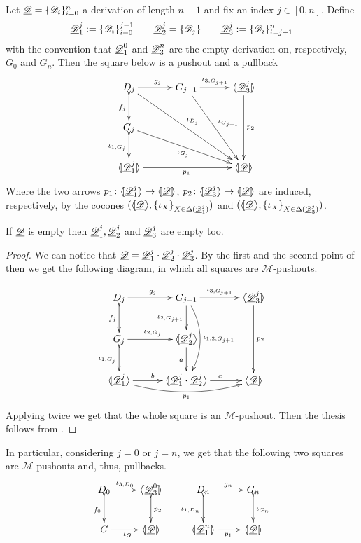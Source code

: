 \begin{corollary}\label{cor:colim}
Let $\underline{\mathscr{D}}=\{\mathscr{D}_i\}_{i=0}^n$ a derivation of length $n+1$ and fix an index $j\in[0,n]$. Define
\[\underline{\mathscr{D}}^j_1:=\{\mathscr{D}_i\}_{i=0}^{j-1} \qquad  \underline{\mathscr{D}}^j_2=\{\mathscr{D}_j\} \qquad \underline{\mathscr{D}}^j_3:=\{\mathscr{D}_i\}_{i=j+1}^n\]
with the convention that $\underline{\mathscr{D}}^0_1$ and $\underline{\mathscr{D}}^n_3$ are the empty derivation on, respectively, $G_0$ and $G_n$. Then the square below is a pushout and a pullback
\[\xymatrix@C=30pt{D_{j} \ar[ddrr]^{\iota_{D_j}} \ar[r]^{g_j}\ar@{>->}[d]_{f_j}& G_{j+1} \ar[ddr]^{\iota_{G_{j+1}}} \ar[r]^-{\iota_{3, G_{j+1}}} & \lpro \der{D}^j_3\rpro \ar[dd]^{p_2} \\ G_j\ar[drr]_{\iota_{G_{j}}} \ar@{>->}[d]_{\iota_{1,G_j}}\\ \lpro \der{D}^j_1 \rpro \ar[rr]_{p_1}  &&\tpro{D} }\] 
Where the two arrows $p_1\colon \langle \hspace{-1.85pt}[\underline{\mathscr{D}}^j_1 ]\hspace{-1.85pt}\rangle\to \langle \hspace{-1.85pt}[ \underline{\mathscr{D}}]\hspace{-1.85pt}\rangle$, $p_2\colon \langle \hspace{-1.85pt}[ \underline{\mathscr{D}}^j_3]\hspace{-1.85pt}\rangle \to \langle \hspace{-1.85pt}[ \underline{\mathscr{D}}]\hspace{-1.85pt}\rangle$ are induced, respectively, by the cocones $(\langle \hspace{-1.85pt}[ \underline{\mathscr{D}}]\hspace{-1.85pt}\rangle, \{\iota_{X}\}_{X\in \Delta(\underline{\mathscr{D}}^j_1)})$ and $(\langle \hspace{-1.85pt}[ \underline{\mathscr{D}}]\hspace{-1.85pt}\rangle, \{\iota_{X}\}_{X\in \Delta(\underline{\mathscr{D}}^j_3)})$.
\end{corollary}
\begin{remark}
If $\underline{\mathscr{D}}$ is empty then $\underline{\mathscr{D}}^j_1, \underline{\mathscr{D}}^j_2$ and $\underline{\mathscr{D}}^j_3$ are empty too.
\end{remark}
\begin{proof}
We can notice that $\underline{\mathscr{D}}=\underline{\mathscr{D}}^j_1\cdot \underline{\mathscr{D}}^j_2 \cdot \underline{\mathscr{D}}^j_3$. By the first and the second point of  then we get the following diagram, in which all squares are $\mathcal{M}$-pushouts.

\[\xymatrix@C=30pt{D_{j}  \ar[r]^{g_j}\ar@{>->}[d]_{f_j}& G_{j+1}  \ar[r]^-{\iota_{3,G_{j+1}}} \ar[d]_{\iota_{2, G_{j+1}}}  \ar@/^.5cm/[dd]^{\iota_{1,2, G_{j+1}}}& \lpro \der{D}^j_3\rpro \ar[dd]^{p_2} \\ G_j \ar[r]^{\iota_{2, G_j}}\ar@{>->}[d]_{\iota_{1,G_j}} & \lpro \der{D}^j_2\rpro \ar[d]_a\\ \lpro \der{D}^j_1 \rpro \ar@/_.4cm/[rr]_{p_1} \ar[r]^b &\lpro \der{D}^j_1\cdot \der{D}^j_2 \rpro \ar[r]^c&\tpro{D} }\] 
Applying  twice we get that the whole square is an $\mathcal{M}$-pushout. Then the thesis follows from .
\end{proof}

\begin{remark}\label{rem:zero1} In particular, considering $j=0$ or $j=n$, we get that the following two squares are $\mathcal{M}$-pushouts and, thus, pullbacks.
	\[\xymatrix{D_0 \ar[r]^-{\iota_{3, D_0}} \ar@{>->}[d]_{f_0}& \lpro \der{D}^0_3 \rpro \ar@{>->}[d]^{p_2} &D_n \ar@{>->}[d]_{\iota_{1, D_n}}\ar[r]^{g_n}& G_n \ar@{>->}[d]^{\iota_{G_n}}\\ G \ar[r]_{\iota_G}& \tpro{D} & \lpro \der{D}^n_1 \rpro \ar[r]_{p_1}  & \tpro{D}}\]
\end{remark}

